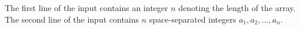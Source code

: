 The first line of the input contains an integer $n$ denoting the length of the array.
The second line of the input contains $n$ space-separated integers $a_1,a_2,\ldots,a_n$.